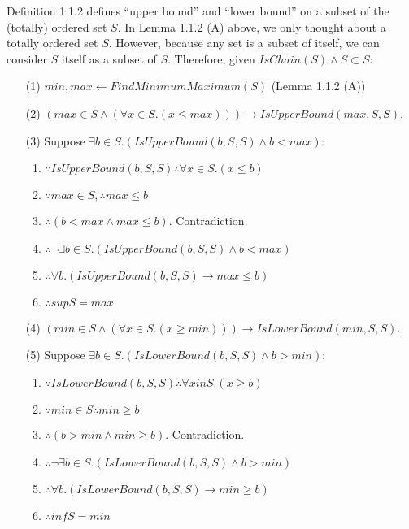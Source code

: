 \documentclass[12pt, letterpaper, oneside]{book}
\begin{document}
Definition 1.1.2 defines ``upper bound'' and ``lower bound'' on a subset of the (totally) ordered
set $S$. In Lemma 1.1.2 (A) above, we only thought about a totally ordered set $S$. However, because
any set is a subset of itself, we can consider $S$ itself as a subset of $S$. Therefore, given
$IsChain(S) \land S \subset S$:
\begin{enumerate}
  \item[(1)] $min, max \leftarrow FindMinimumMaximum(S)$ (Lemma 1.1.2 (A))
  \item[(2)] $(max \in S \land (\forall x \in S. (x \leqslant max))) \rightarrow IsUpperBound(max, S, S)$.
  \item[(3)] Suppose $\exists b \in S. (IsUpperBound(b, S, S) \land b < max)$:
        \begin{enumerate}
          \item $\because IsUpperBound(b, S, S) \therefore \forall x \in S. (x \leqslant b)$
          \item $\because max \in S, \therefore max \leqslant b$
          \item $\therefore (b < max \land max \leqslant b)$. Contradiction.
          \item $\therefore \lnot \exists b \in S. (IsUpperBound(b, S, S) \land b < max)$
          \item $\therefore \forall b. (IsUpperBound(b, S, S) \rightarrow max \leqslant b)$
          \item $\therefore sup S = max$
        \end{enumerate}
  \item[(4)] $(min \in S \land (\forall x \in S. (x \geqslant min))) \rightarrow IsLowerBound(min, S, S)$.
  \item[(5)] Suppose $\exists b \in S. (IsLowerBound(b, S, S) \land b > min)$:
        \begin{enumerate}
          \item $\because IsLowerBound(b, S, S) \therefore \forall x in S. (x \geqslant b)$
          \item $\because min \in S \therefore min \geqslant b$
          \item $\therefore (b > min \land min \geqslant b)$. Contradiction.
          \item $\therefore \lnot \exists b \in S. (IsLowerBound(b, S, S) \land b > min)$
          \item $\therefore \forall b. (IsLowerBound(b, S, S) \rightarrow min \geqslant b)$
          \item $\therefore inf S = min$
        \end{enumerate}
\end{enumerate}
\end{document}
